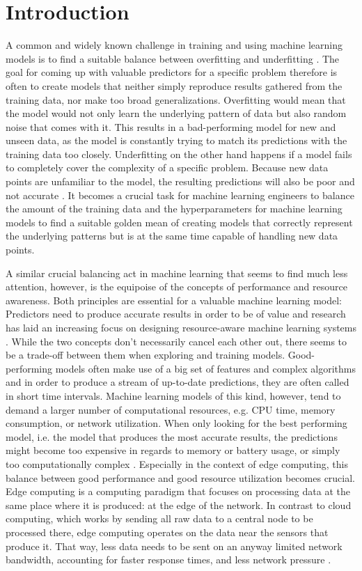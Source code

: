 \chapter{Introduction} \label{chap:introduction}


A common and widely known challenge in training and using machine learning models is to find a suitable balance between overfitting and underfitting \cite{vanderaalst2010}. The goal for coming up with valuable predictors for a specific problem therefore is often to create models that neither simply reproduce results gathered from the training data, nor make too broad generalizations. Overfitting would mean that the model would not only learn the underlying pattern of data but also random noise that comes with it. This results in a bad-performing model for new and unseen data, as the model is constantly trying to match its predictions with the training data too closely. Underfitting on the other hand happens if a model fails to completely cover the complexity of a specific problem. Because new data points are unfamiliar to the model, the resulting predictions will also be poor and not accurate \cite{montesinoslopez2022}.  It becomes a crucial task for machine learning engineers to balance the amount of the training data and the hyperparameters for machine learning models to find a suitable golden mean of creating models that correctly represent the underlying patterns but is at the same time capable of handling new data points. 

A similar crucial balancing act in machine learning that seems to find much less attention, however, is the equipoise of the concepts of performance and resource awareness. Both principles are essential for a valuable machine learning model: Predictors need to produce accurate results in order to be of value and research has laid an increasing focus on designing resource-aware machine learning systems \cite{rapp2022}. While the two concepts don’t necessarily cancel each other out, there seems to be a trade-off between them when exploring and training models. Good-performing models often make use of a big set of features and complex algorithms and in order to produce a stream of up-to-date predictions, they are often called in short time intervals. Machine learning models of this kind, however, tend to demand a larger number of computational resources, e.g. CPU time, memory consumption, or network utilization. When only looking for the best performing model, i.e. the model that produces the most accurate results, the predictions might become too expensive in regards to memory or battery usage, or simply too computationally complex \cite{preuveneers2020}. Especially in the context of edge computing, this balance between good performance and good resource utilization becomes crucial. Edge computing is a computing paradigm that focuses on processing data at the same place where it is produced: at the edge of the network. In contrast to cloud computing, which works by sending all raw data to a central node to be processed there, edge computing operates on the data near the sensors that produce it. That way, less data needs to be sent on an anyway limited network bandwidth, accounting for faster response times, and less network pressure \cite{shi2016}.

